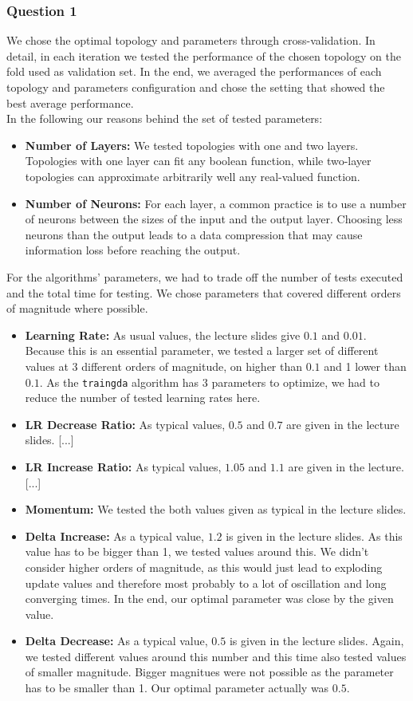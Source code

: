 \documentclass{article}
\begin{document}
\subsubsection*{Question 1}
We chose the optimal topology and parameters through cross-validation. In detail, in each iteration we tested the performance of the chosen topology on the fold used as validation set. In the end, we averaged the performances of each topology and parameters configuration and chose the setting that showed the best average performance.\\
In the following our reasons behind the set of tested parameters:
\begin{itemize}
\item \textbf{Number of Layers:} We tested topologies with one and two layers. Topologies with one layer can fit any boolean function, while two-layer topologies can approximate arbitrarily well any real-valued function.
\item \textbf{Number of Neurons:} For each layer, a common practice is to use a number of neurons between the sizes of the input and the output layer. Choosing less neurons than the output leads to a data compression that may cause information loss before reaching the output.
\end{itemize}
For the algorithms' parameters, we had to trade off the number of tests executed and the total time for testing. We chose parameters that covered different orders of magnitude where possible.
\begin{itemize}
\item \textbf{Learning Rate:} As usual values, the lecture slides give $0.1$ and $0.01$. Because this is an essential parameter, we tested a larger set of different values at 3 different orders of magnitude, on higher than $0.1$ and 1 lower than $0.1$. As the \verb$traingda$ algorithm has 3 parameters to optimize, we had to reduce the number of tested learning rates here.
\item \textbf{LR Decrease Ratio:} As typical values, $0.5$ and $0.7$ are given in the lecture slides. [...]
\item \textbf{LR Increase Ratio:} As typical values, $1.05$ and $1.1$ are given in the lecture. [...]
\item \textbf{Momentum:} We tested the both values given as typical in the lecture slides.
\item \textbf{Delta Increase:} As a typical value, $1.2$ is given in the lecture slides. As this value has to be bigger than 1, we tested values around this. We didn't consider higher orders of magnitude, as this would just lead to exploding update values and therefore most probably to a lot of oscillation and long converging times. In the end, our optimal parameter was close by the given value.
\item \textbf{Delta Decrease:} As a typical value, $0.5$ is given in the lecture slides. Again, we tested different values around this number and this time also tested values of smaller magnitude. Bigger magnitues were not possible as the parameter has to be smaller than 1. Our optimal parameter actually was $0.5$.
\end{itemize}
\end{document}
